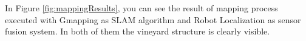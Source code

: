 \par In Figure \ref{fig:mappingResults}, you can see the result of mapping process executed with Gmapping as \ac{SLAM} algorithm and Robot Localization as sensor fusion system. In both of them the vineyard structure is clearly visible.


\begin{figure}
	\begin{minipage}[c]{.5\textwidth}
	\centering
	\end{minipage}
	\begin{minipage}[c]{.5\textwidth}
	\subfloat[]{%
}
\end{minipage}
\end{figure}
